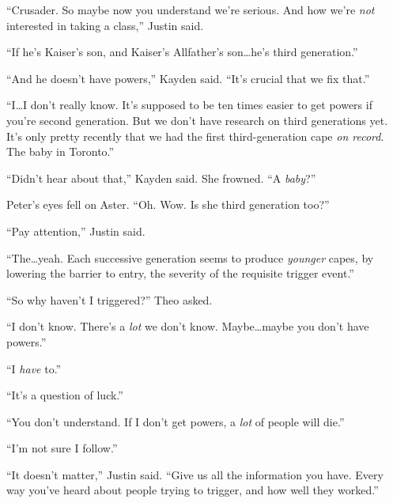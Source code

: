 ``Crusader.  So maybe now you understand we're serious.  And how we're \emph{not} interested in taking a class,'' Justin said.



``If he's Kaiser's son, and Kaiser's Allfather's son\ldots he's third generation.''



``And he doesn't have powers,'' Kayden said.  ``It's crucial that we fix that.''



``I\ldots I don't really know.  It's supposed to be ten times easier to get powers if you're second generation.  But we don't have research on third generations yet.  It's only pretty recently that we had the first third-generation cape \emph{on record}.  The baby in Toronto.''



``Didn't hear about that,'' Kayden said.  She frowned.  ``A \emph{baby}?''



Peter's eyes fell on Aster.  ``Oh.  Wow.  Is she third generation too?''



``Pay attention,'' Justin said.



``The\ldots yeah.  Each successive generation seems to produce \emph{younger} capes, by lowering the barrier to entry, the severity of the requisite trigger event.''



``So why haven't I triggered?''  Theo asked.



``I don't know.  There's a \emph{lot} we don't know.   Maybe\ldots maybe you don't have powers.''



``I \emph{have} to.''



``It's a question of luck.''



``You don't understand.  If I don't get powers, a \emph{lot} of people will die.''



``I'm not sure I follow.''



``It doesn't matter,'' Justin said.  ``Give us all the information you have.  Every way you've heard about people trying to trigger, and how well they worked.''



